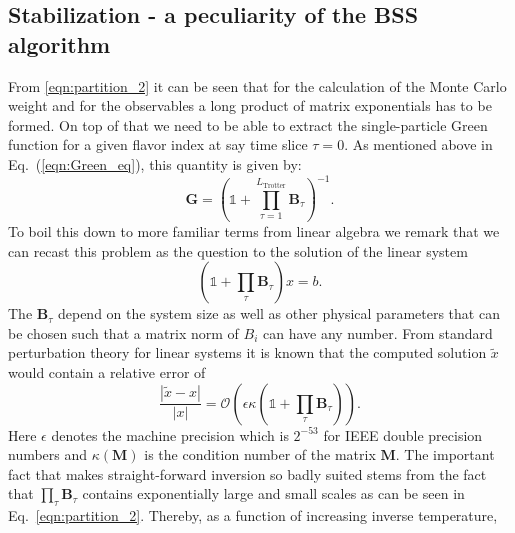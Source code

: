 %
\subsection{Stabilization - a peculiarity of the BSS algorithm}\label{sec:stable}
%
From \eqref{eqn:partition_2} it can be seen that for the calculation of the Monte Carlo weight
and for the observables a long product of matrix exponentials has to be formed.
On top of that we need to be able to extract the single-particle Green function  for a given flavor index at say time slice $\tau = 0$.  As  mentioned above in Eq.~(\ref{eqn:Green_eq}), this quantity is given by: 
\begin{equation}
\bm{G}= \left( \mathds{1} + \prod_{ \tau= 1}^{L_{\text{Trotter}}} \bm{B}_\tau \right)^{-1}.
\end{equation}
To boil this down to more familiar terms from linear algebra we remark that we can recast this problem as the question to the solution of the linear system
\begin{equation}
(\mathds{1} + \prod_\tau \bm{B}_\tau) x = b.
\end{equation}
The $\bm{B}_\tau$ depend on the system size as well as other physical parameters that can be chosen such that a matrix norm of $B_i$ can have any number.
From standard perturbation theory for linear systems it is known that the computed solution $\tilde{x}$ would 
contain a relative error of
\begin{equation}
\frac{|\tilde{x} - x|}{|x|} = \mathcal{O}\left(\epsilon \kappa(\mathds{1} + \prod_\tau \bm{B}_\tau)\right).
\end{equation}
Here $\epsilon$ denotes the machine precision which is $2^{-53}$ for IEEE double precision numbers
and $\kappa(\bm{M})$ is the condition number of the matrix $\bm{M}$.
The important fact that makes straight-forward inversion so badly suited  stems from the fact that $  \prod_ \tau \bm{B}_\tau $ contains exponentially large and small scales as can be seen in Eq.~\eqref{eqn:partition_2}.  Thereby, as a function of increasing inverse temperature, 
